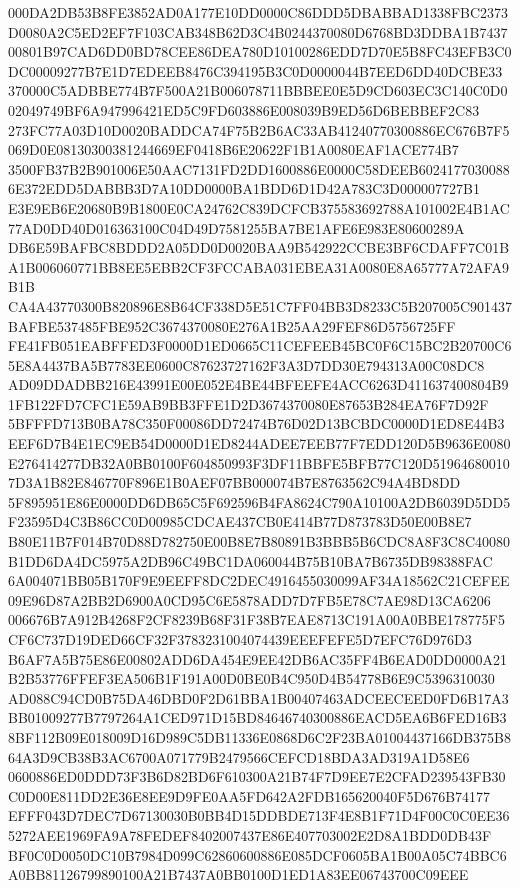 \documentclass[UTF8,fontset=fandol,zihao=-4,a4paper]{ctexart}
\begin{document}
{{000DA2DB53B8FE3852AD0A177E10DD0000C86DDD5DBABBAD1338FBC2373D0080A2C5ED2EF7F103CAB348B62D3C4B0244370080D6768BD3DDBA1B7437
00801B97CAD6DD0BD78CEE86DEA780D10100286EDD7D70E5B8FC43EFB3C0DC00009277B7E1D7EDEEB8476C394195B3C0D0000044B7EED6DD40DCBE33
370000C5ADBBE774B7F500A21B006078711BBBEE0E5D9CD603EC3C140C0D002049749BF6A947996421ED5C9FD603886E008039B9ED56D6BEBBEF2C83
273FC77A03D10D0020BADDCA74F75B2B6AC33AB41240770300886EC676B7F5069D0E08130300381244669EF0418B6E20622F1B1A0080EAF1ACE774B7
3500FB37B2B901006E50AAC7131FD2DD1600886E0000C58DEEB60241770300886E372EDD5DABBB3D7A10DD0000BA1BDD6D1D42A783C3D000007727B1
E3E9EB6E20680B9B1800E0CA24762C839DCFCB375583692788A101002E4B1AC77AD0DD40D016363100C04D49D7581255BA7BE1AFE6E983E80600289A
DB6E59BAFBC8BDDD2A05DD0D0020BAA9B542922CCBE3BF6CDAFF7C01BA1B006060771BB8EE5EBB2CF3FCCABA031EBEA31A0080E8A65777A72AFA9B1B
CA4A43770300B820896E8B64CF338D5E51C7FF04BB3D8233C5B207005C901437BAFBE537485FBE952C3674370080E276A1B25AA29FEF86D5756725FF
FE41FB051EABFFED3F0000D1ED0665C11CEFEEB45BC0F6C15BC2B20700C65E8A4437BA5B7783EE0600C87623727162F3A3D7DD30E794313A00C08DC8
AD09DDADBB216E43991E00E052E4BE44BFEEFE4ACC6263D411637400804B91FB122FD7CFC1E59AB9BB3FFE1D2D3674370080E87653B284EA76F7D92F
5BFFFD713B0BA78C350F00086DD72474B76D02D13BCBDC0000D1ED8E44B3EEF6D7B4E1EC9EB54D0000D1ED8244ADEE7EEB77F7EDD120D5B9636E0080
E276414277DB32A0BB0100F604850993F3DF11BBFE5BFB77C120D519646800107D3A1B82E846770F896E1B0AEF07BB000074B7E8763562C94A4BD8DD
5F895951E86E0000DD6DB65C5F692596B4FA8624C790A10100A2DB6039D5DD5F23595D4C3B86CC0D00985CDCAE437CB0E414B77D873783D50E00B8E7
B80E11B7F014B70D88D782750E00B8E7B80891B3BBB5B6CDC8A8F3C8C40080B1DD6DA4DC5975A2DB96C49BC1DA060044B75B10BA7B6735DB98388FAC
6A004071BB05B170F9E9EEFF8DC2DEC4916455030099AF34A18562C21CEFEE09E96D87A2BB2D6900A0CD95C6E5878ADD7D7FB5E78C7AE98D13CA6206
006676B7A912B4268F2CF8239B68F31F38B7EAE8713C191A00A0BBE178775F5CF6C737D19DED66CF32F3783231004074439EEEFEFE5D7EFC76D976D3
B6AF7A5B75E86E00802ADD6DA454E9EE42DB6AC35FF4B6EAD0DD0000A21B2B53776FFEF3EA506B1F191A00D0BE0B4C950D4B54778B6E9C5396310030
AD088C94CD0B75DA46DBD0F2D61BBA1B00407463ADCEECEED0FD6B17A3BB01009277B7797264A1CED971D15BD84646740300886EACD5EA6B6FED16B3
8BF112B09E018009D16D989C5DB11336E0868D6C2F23BA01004437166DB375B864A3D9CB38B3AC6700A071779B2479566CEFCD18BDA3AD319A1D58E6
0600886ED0DDD73F3B6D82BD6F610300A21B74F7D9EE7E2CFAD239543FB30C0D00E811DD2E36E8EE9D9FE0AA5FD642A2FDB165620040F5D676B74177
EFFF043D7DEC7D67130030B0BB4D15DDBDE713F4E8B1F71D4F00C0C0EE365272AEE1969FA9A78FEDEF8402007437E86E407703002E2D8A1BDD0DB43F
BF0C0D0050DC10B7984D099C62860600886E085DCF0605BA1B00A05C74BBC6A0BB81126799890100A21B7437A0BB0100D1ED1A83EE06743700C09EEE
}}
\end{document}
